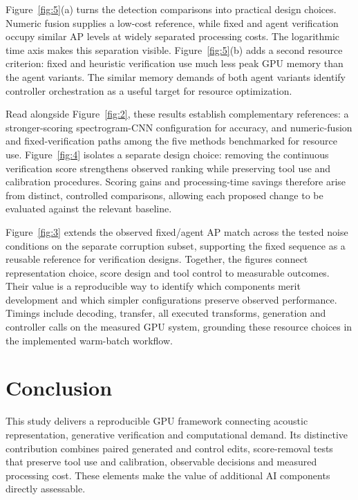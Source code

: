 \documentclass[11pt,letterpaper]{article}
\begin{document}
Figure~\ref{fig:5}(a) turns the detection comparisons into practical design choices. Numeric fusion supplies a low-cost reference, while fixed and agent verification occupy similar AP levels at widely separated processing costs. The logarithmic time axis makes this separation visible. Figure~\ref{fig:5}(b) adds a second resource criterion: fixed and heuristic verification use much less peak GPU memory than the agent variants. The similar memory demands of both agent variants identify controller orchestration as a useful target for resource optimization.\par

Read alongside Figure~\ref{fig:2}, these results establish complementary references: a stronger-scoring spectrogram-CNN configuration for accuracy, and numeric-fusion and fixed-verification paths among the five methods benchmarked for resource use. Figure~\ref{fig:4} isolates a separate design choice: removing the continuous verification score strengthens observed ranking while preserving tool use and calibration procedures. Scoring gains and processing-time savings therefore arise from distinct, controlled comparisons, allowing each proposed change to be evaluated against the relevant baseline.\par

Figure~\ref{fig:3} extends the observed fixed/agent AP match across the tested noise conditions on the separate corruption subset, supporting the fixed sequence as a reusable reference for verification designs. Together, the figures connect representation choice, score design and tool control to measurable outcomes. Their value is a reproducible way to identify which components merit development and which simpler configurations preserve observed performance. Timings include decoding, transfer, all executed transforms, generation and controller calls on the measured GPU system, grounding these resource choices in the implemented warm-batch workflow.\par

\clearpage

\section{Conclusion}

This study delivers a reproducible GPU framework connecting acoustic representation, generative verification and computational demand. Its distinctive contribution combines paired generated and control edits, score-removal tests that preserve tool use and calibration, observable decisions and measured processing cost. These elements make the value of additional AI components directly assessable.\par
\end{document}
